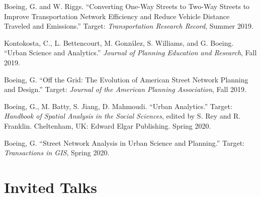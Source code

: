 \documentclass[12pt,letterpaper]{report}
\begin{document}
    \begin{tablist}
        
        \item[\the\year] \tab Boeing, G. and W. Riggs. \enquote{Converting One-Way Streets to Two-Way Streets to Improve Transportation Network Efficiency and Reduce Vehicle Distance Traveled and Emissions.} Target: \textit{Transportation Research Record}, Summer 2019.
        
        \item[\the\year] \tab Kontokosta, C., L. Bettencourt, M. González, S. Williams, and G. Boeing. \enquote{Urban Science and Analytics.} \textit{Journal of Planning Education and Research}, Fall 2019.

        \item[\the\year] \tab Boeing, G. \enquote{Off the Grid: The Evolution of American Street Network Planning and Design.} Target: \textit{Journal of the American Planning Association}, Fall 2019.

        \item[\the\year] \tab Boeing, G., M. Batty, S. Jiang, D. Mahmoudi. \enquote{Urban Analytics.} Target: \textit{Handbook of Spatial Analysis in the Social Sciences}, edited by S. Rey and R. Franklin. Cheltenham, UK: Edward Elgar Publishing. Spring 2020.
        
        \item[\the\year] \tab Boeing, G. \enquote{Street Network Analysis in Urban Science and Planning.} Target: \textit{Transactions in GIS}, Spring 2020.

    \end{tablist}



    \section*{Invited Talks}
\end{document}
